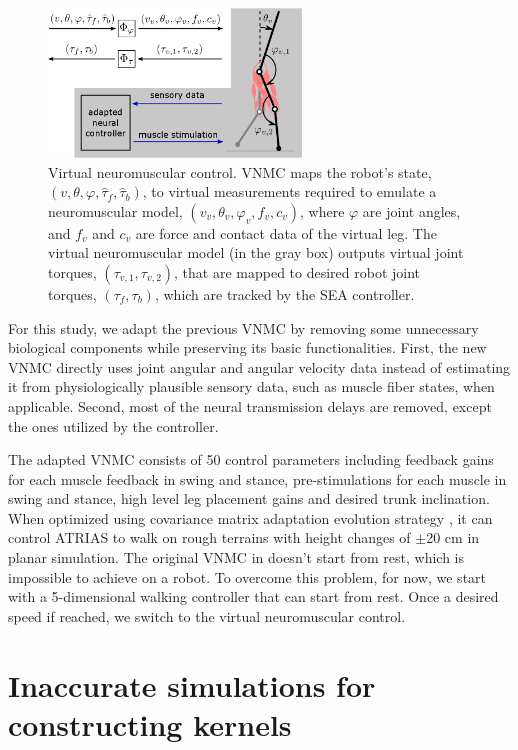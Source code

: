 \begin{figure}[t]
\centering
\includegraphics[width=0.6\textwidth]{img/VNMC.png}
\caption{\small{Virtual neuromuscular control.
VNMC maps the robot's state, $(v, \theta, \varphi, \hat{\tau}_f, \hat{\tau}_b)$, to virtual measurements required to emulate a neuromuscular model, $(v_v, \theta_v,  \varphi_v, f_v, c_v)$, where $\varphi$ are joint angles, and $f_v$ and $c_v$ are force and contact data of the virtual leg.
The virtual neuromuscular model (in the gray box) outputs virtual joint torques, $(\tau_{v,1}, \tau_{v,2})$, that are mapped to desired robot joint torques, $(\tau_f, \tau_b)$, which are tracked by the SEA controller.}}
\label{fig:VNMC}
\end{figure}

For this study, we adapt the previous VNMC \cite{batts2015toward} by removing some unnecessary biological components while preserving its basic functionalities.
First, the new VNMC directly uses joint angular and angular velocity data instead of estimating it from physiologically plausible sensory data, such as muscle fiber states, when applicable.
Second, most of the neural transmission delays are removed, except the ones utilized by the controller.

The adapted VNMC consists of 50 control parameters including feedback gains for each muscle feedback in swing and stance, pre-stimulations for each muscle in swing and stance, high level leg placement gains and desired trunk inclination. When optimized using covariance matrix adaptation evolution strategy \cite{hansen2006cma}, it can control ATRIAS to walk on rough terrains with height changes of $\pm$20 cm in planar simulation. The original VNMC in \cite{batts2015toward} doesn't start from rest, which is impossible to achieve on a robot. To overcome this problem, for now, we start with a 5-dimensional walking controller that can start from rest. Once a desired speed if reached, we switch to the virtual neuromuscular control.

\section{Inaccurate simulations for constructing kernels}

